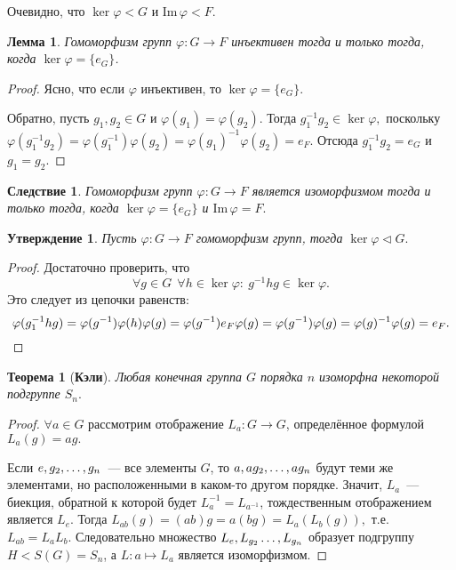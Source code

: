 \documentclass[a4paper, 14pt]{extarticle}
\newcommand{\n}{\par}
\newcommand{\im}{\mathrm{Im} \,}
\renewcommand{\phi}{\varphi}
\theoremstyle{definition}
\theoremstyle{plain}
\newtheorem*{theorem*}{Теорема}
\numberwithin{theorem}{section}
\numberwithin{definition}{section}
\newtheorem{statement}{Утверждение}
\numberwithin{statement}{section}
\newtheorem{lemma}{Лемма}
\numberwithin{lemma}{section}
\newtheorem*{consequence*}{Следствие}
\numberwithin{consequence}{section}
\begin{document}
	Очевидно, что $\ker \phi < G$ и Im$\, \phi < F.$
	\begin{lemma}
		Гомоморфизм групп ${\phi: G \rightarrow F}$ инъективен тогда и только тогда, когда  $\ker \phi = \{e_G\}$.
	\end{lemma}
	\begin{proof}
		Ясно, что если $\phi$ инъективен, то $\ker \phi = \{e_G\}.$ \n
		Обратно, пусть ${g_1, g_2 \in G}$ и ${\phi(g_1) = \phi(g_2).}$ Тогда ${g^{-1}_1g_2 \in \ker \phi,}$ поскольку ${\phi(g^{-1}_1g_2) = \phi(g^{-1}_1) \phi(g_2) = \phi(g_1)^{-1} \phi(g_2) = e_F.}$ Отсюда $g^{-1}_1g_2 = e_G$ и $g_1 = g_2.$
	\end{proof}
	\begin{consequence*}
		Гомоморфизм групп ${\phi: G \rightarrow F}$ является изоморфизмом тогда и только тогда, когда ${\ker \phi = \{e_G\}}$ и ${\im \phi = F.}$
	\end{consequence*}
	\begin{statement}
		Пусть ${\phi: G \rightarrow F}$ гомоморфизм групп, тогда ${\ker \phi \lhd G.}$
	\end{statement}
	\begin{proof}
		Достаточно проверить, что
		\begin{equation*}
			\forall g \in G \ \ \forall h \in \ker \phi{:} \ g^{-1}hg \in \ker \phi.
		\end{equation*}
		Это следует из цепочки равенств:
		\begin{equation*}
			\phi(g^{-1}_1hg) = \phi(g^{-1}) \phi(h) \phi(g) = \phi(g^{-1}) e_F \phi(g) = \phi(g^{-1}) \phi(g) = \phi(g)^{-1} \phi(g) = e_F. \qedhere
		\end{equation*}
	\end{proof}
        \newpage
        \begin{theorem*}[\textbf{Кэли}]
		Любая конечная группа $G$ порядка $n$ изоморфна некоторой подгруппе $S_n.$
	\end{theorem*}
	\begin{proof}
		  $\forall {a \in G}$ рассмотрим отображение ${L_a : G \rightarrow G}$, определённое формулой ${L_a(g) = ag.}$\n
          Если $e, g_2,\mathellipsis,g_n$~--- все элементы $G$, то $a, ag_2,\mathellipsis,ag_n$ будут теми же элементами, но расположенными в каком-то другом порядке. Значит, $L_a$~--- биекция, обратной к которой будет $L_a^{-1} = L_{a^{-1}}$, тождественным отображением является $L_e$. Тогда $L_{ab}(g) = (ab)g = a(bg) = L_a(L_b(g)),$ т.е. $L_{ab} = L_a L_b.$ Следовательно множество $L_e, L_{g_2}\mathellipsis,L_{g_n}$ образует подгруппу ${H < S(G) = S_n}$, а ${L : a \mapsto L_a}$ является изоморфизмом.
	\end{proof}
	\newpage
\end{document}
